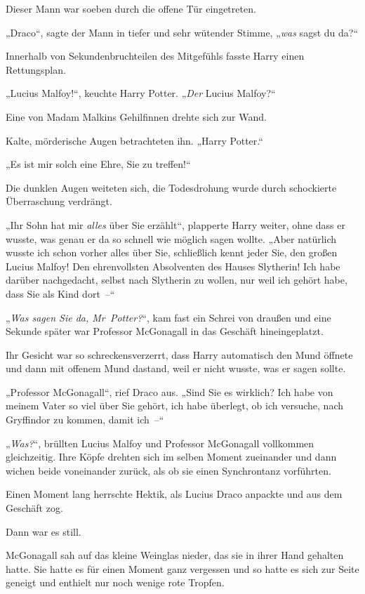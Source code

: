 Dieser Mann war soeben durch die offene Tür eingetreten.

„Draco“, sagte der Mann in tiefer und sehr wütender Stimme, „\emph{was} sagst du da?“

Innerhalb von Sekundenbruchteilen des Mitgefühls fasste Harry einen Rettungsplan.

„Lucius Malfoy!“, keuchte Harry Potter. „\emph{Der} Lucius Malfoy?“

Eine von Madam Malkins Gehilfinnen drehte sich zur Wand.

Kalte, mörderische Augen betrachteten ihn. „Harry Potter.“

„Es ist mir solch eine Ehre, Sie zu treffen!“

Die dunklen Augen weiteten sich, die Todesdrohung wurde durch schockierte Überraschung verdrängt.

„Ihr Sohn hat mir \emph{alles} über Sie erzählt“, plapperte Harry weiter, ohne dass er wusste, was genau er da so schnell wie möglich sagen wollte. „Aber natürlich wusste ich schon vorher alles über Sie, schließlich kennt jeder Sie, den großen Lucius Malfoy! Den ehrenvollsten Absolventen des Hauses Slytherin! Ich habe darüber nachgedacht, selbst nach Slytherin zu wollen, nur weil ich gehört habe, dass Sie als Kind dort –“

„\emph{Was sagen Sie da, Mr~Potter?}“, kam fast ein Schrei von draußen und eine Sekunde später war Professor McGonagall in das Geschäft hineingeplatzt.

Ihr Gesicht war so schreckensverzerrt, dass Harry automatisch den Mund öffnete und dann mit offenem Mund dastand, weil er nicht wusste, was er sagen sollte.

„Professor McGonagall“, rief Draco aus. „Sind Sie es wirklich? Ich habe von meinem Vater so viel über Sie gehört, ich habe überlegt, ob ich versuche, nach Gryffindor zu kommen, damit ich –“

„\emph{Was?}“, brüllten Lucius Malfoy und Professor McGonagall vollkommen gleichzeitig. Ihre Köpfe drehten sich im selben Moment zueinander und dann wichen beide voneinander zurück, als ob sie einen Synchrontanz vorführten.

Einen Moment lang herrschte Hektik, als Lucius Draco anpackte und aus dem Geschäft zog.

Dann war es still.

McGonagall sah auf das kleine Weinglas nieder, das sie in ihrer Hand gehalten hatte. Sie hatte es für einen Moment ganz vergessen und so hatte es sich zur Seite geneigt und enthielt nur noch wenige rote Tropfen.

